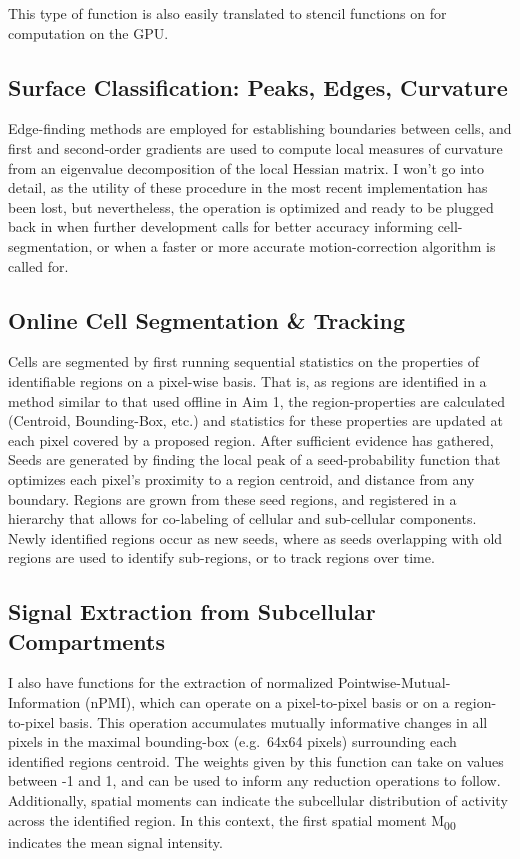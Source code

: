 This type of function is also easily translated to stencil functions on for computation on the GPU.


\subsection{Surface Classification: Peaks, Edges, Curvature}\label{sec:surface-classification-peaks-edges-curvature}

Edge-finding methods are employed for establishing boundaries between cells, and first and second-order gradients are used to compute local measures of curvature from an eigenvalue decomposition of the local Hessian matrix.
I won't go into detail, as the utility of these procedure in the most recent implementation has been lost, but nevertheless, the operation is optimized and ready to be plugged back in when further development calls for better accuracy informing cell-segmentation, or when a faster or more accurate motion-correction algorithm is called for.

\subsection{Online Cell Segmentation \& Tracking}\label{sec:online-cell-segmentation-tracking}

Cells are segmented by first running sequential statistics on the properties of identifiable regions on a pixel-wise basis.
That is, as regions are identified in a method similar to that used offline in Aim 1, the region-properties are calculated (Centroid, Bounding-Box, etc.) and statistics for these properties are updated at each pixel covered by a proposed region.
After sufficient evidence has gathered, Seeds are generated by finding the local peak of a seed-probability function that optimizes each pixel's proximity to a region centroid, and distance from any boundary.
Regions are grown from these seed regions, and registered in a hierarchy that allows for co-labeling of cellular and sub-cellular components.
Newly identified regions occur as new seeds, where as seeds overlapping with old regions are used to identify sub-regions, or to track regions over time.

\subsection{Signal Extraction from Subcellular Compartments}\label{sec:signal-extraction-from-subcellular-compartments}

I also have functions for the extraction of normalized Pointwise-Mutual-Information (nPMI), which can operate on a pixel-to-pixel basis or on a region-to-pixel basis.
This operation accumulates mutually informative changes in all pixels in the maximal bounding-box (e.g.~64x64 pixels) surrounding each identified regions centroid.
The weights given by this function can take on values between -1 and 1, and can be used to inform any reduction operations to follow.
Additionally, spatial moments can indicate the subcellular distribution of activity across the identified region.
In this context, the first spatial moment M\textsubscript{00} indicates the mean signal intensity.


